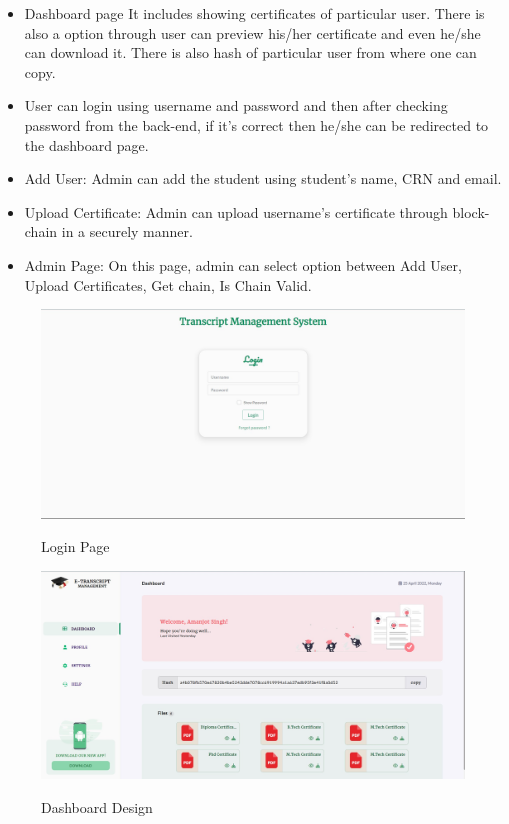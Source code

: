 \begin{itemize}
    \item Dashboard page It includes showing certificates of particular user.  There is also a option through user can preview his/her certificate and even he/she can download it. There is also hash of particular user from where one can copy.
    
    \item User can login using username and password and then after checking password from the back-end, if it's correct then he/she can be redirected to the dashboard page.
    
    \item Add User: Admin can add the student using student's name, CRN and email. 
    
    \item Upload Certificate: Admin can upload username's certificate through block-chain in a securely manner.
    
    \item Admin Page: On this page, admin can select option between Add User, Upload Certificates, Get chain, Is Chain Valid.
    
\end{itemize}

\begin{figure}[h]
    \centering
    \includegraphics[scale=0.32]{images/login.jpg}\\[0.5cm]
    \caption{Login Page}
    \label{fig:login}
\end{figure}

\begin{figure}[H]
    \centering
    \includegraphics[scale=0.32]{images/Dashboard.jpg}\\[0.5cm]
    \caption{Dashboard Design}
    \label{fig:my_label}
\end{figure}

